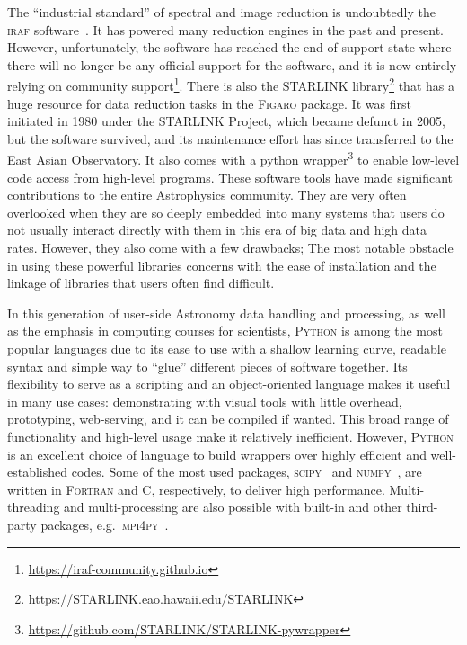 \documentclass[linenumbers, twocolumn]{aastex631}
\begin{document}
The ``industrial standard'' of spectral and image reduction is undoubtedly
the \textsc{iraf} software~\citep{1986SPIE..627..733T, 1993ASPC...52..173T}.
It has powered many reduction engines in the past and present. However,
unfortunately, the software has reached the end-of-support state where there
will no longer be any official support for the software, and it is now
entirely relying on community support\footnote{\url{https://iraf-community.github.io}}.
There is also the \textsc{STARLINK}
library\footnote{\url{https://STARLINK.eao.hawaii.edu/STARLINK}}\citep{2014ASPC..485..391C, 2022ASPC..532..559B}
that has a huge resource for data reduction tasks in the \textsc{Figaro} package. It was first initiated
in 1980 under the STARLINK Project, which became defunct in 2005, but the
software survived, and its maintenance effort has since transferred to the
East Asian Observatory. It also comes with a python
wrapper\footnote{\url{https://github.com/STARLINK/STARLINK-pywrapper}}
to enable low-level code access from high-level programs. These software tools
have made significant contributions to the entire Astrophysics community. They
are very often overlooked when they are so deeply embedded into many systems
that users do not usually interact directly with them in this era of big data
and high data rates. However, they also come with a few drawbacks; The most
notable obstacle in using these powerful libraries concerns with the ease of
installation and the linkage of libraries that users often find difficult.

In this generation of user-side Astronomy data handling and processing, as
well as the emphasis in computing courses for scientists, \textsc{Python} is
among the most popular languages due to its ease to use with a shallow learning
curve, readable syntax and simple way to ``glue'' different pieces of software
together. Its flexibility to serve as a scripting and an object-oriented
language makes it useful in many use cases: demonstrating with visual tools
with little overhead, prototyping, web-serving, and it can be compiled if
wanted. This broad range of functionality and high-level usage make it
relatively inefficient. However, \textsc{Python} is an excellent choice of
language to build wrappers over highly efficient and well-established codes.
Some of the most used packages, \textsc{scipy}~\citep{2020SciPy-NMeth}
and \textsc{numpy}~\citep{2020NumPy-Array}, are written in \textsc{Fortran}
and \textsc{C}, respectively, to deliver high performance. Multi-threading
and multi-processing are also possible with built-in and other third-party
packages, e.g.\ \textsc{mpi4py}~\citep{DALCIN20111124}. 
\end{document}
